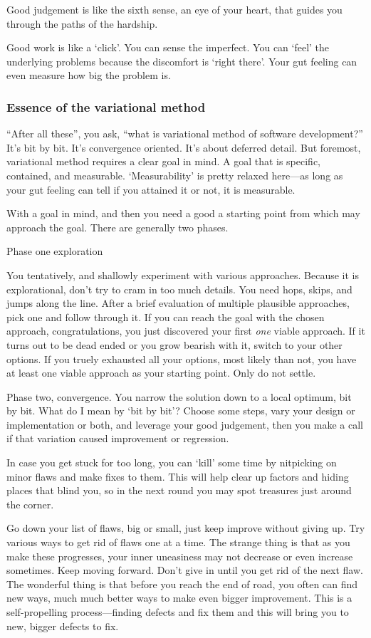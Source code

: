 Good judgement is like the sixth sense, an eye of your heart, that guides you through the paths of
the hardship.

Good work is like a `click'.
You can sense the imperfect.
You can `feel' the underlying problems because the discomfort is `right there'.
Your gut feeling can even measure how big the problem is.

\subsubsection{Essence of the variational method}
``After all these'', you ask, ``what is variational method of software development?''
It's bit by bit.
It's convergence oriented.
It's about deferred detail.
But foremost, variational method requires a clear goal in mind.
A goal that is specific, contained, and measurable.
`Measurability' is pretty relaxed here---as long as your gut feeling can tell if you attained it
or not, it is measurable.

With a goal in mind, and then you need a good a starting point from which may approach the goal.
There are generally two phases.

Phase one exploration

You tentatively, and shallowly experiment with various approaches.
Because it is explorational, don't try to cram in too much details.
You need hops, skips, and jumps along the line.
After a brief evaluation of multiple plausible approaches, pick one and follow through it.
If you can reach the goal with the chosen approach, congratulations, you just discovered your first
\emph{one} viable approach.
If it turns out to be dead ended or you grow bearish with it, switch to your other options.
If you truely exhausted all your options, most likely than not, you have at least one viable
approach as your starting point.
Only do not settle.

Phase two, convergence.
You narrow the solution down to a local optimum, bit by bit.
What do I mean by `bit by bit'?
Choose some steps, vary your design or implementation or both, and leverage your good judgement,
then you make a call if that variation caused improvement or regression.

In case you get stuck for too long, you can `kill' some time by nitpicking on minor flaws and
make fixes to them.
This will help clear up factors and hiding places that blind you, so in the next round you may
spot treasures just around the corner.

Go down your list of flaws, big or small, just keep improve without giving up.
Try various ways to get rid of flaws one at a time.
The strange thing is that as you make these progresses, your inner uneasiness may not decrease or
even increase sometimes.
Keep moving forward.
Don't give in until you get rid of the next flaw.
The wonderful thing is that before you reach the end of road, you often can find new ways, much
much better ways to make even bigger improvement.
This is a self-propelling process---finding defects and fix them and this will bring you to new,
bigger defects to fix.

